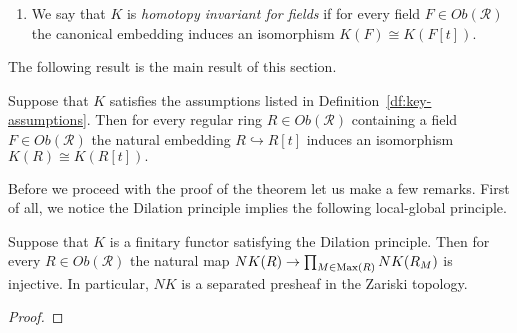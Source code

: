 \documentclass[oneside, 11pt]{amsart} \pdfoutput=1
\begin{document}
\begin{df}
\begin{enumerate}[label=(P\normalfont\arabic*)]
  \item \label{HIF} We say that $K$ is {\it homotopy invariant for fields} if for every field $F \in Ob(\mathcal{R})$ the canonical embedding induces an isomorphism $K(F) \cong K(F[t])$.
 \end{enumerate}
\end{df} 

The following result is the main result of this section.
\begin{theorem}
\label{lpb}
Suppose that $K$ satisfies the assumptions listed in Definition~\ref{df:key-assumptions}.
Then for every regular ring $R\in Ob(\mathcal{R})$ containing a field $F \in Ob(\mathcal{R})$ the natural embedding $R \hookrightarrow R[t]$ induces an isomorphism $K(R)\cong K(R[t]).$
\end{theorem}

Before we proceed with the proof of the theorem let us make a few remarks.
First of all, we notice the Dilation principle implies the following local-global principle.
\begin{lemma} \label{LGP}
 Suppose that $K$ is a finitary functor satisfying the Dilation principle.
 Then for every $R\in Ob(\mathcal{R})$ the natural map $NK(R) \to \prod_{M \in \mathrm{Max}(R)} NK(R_M)$ is injective.
 In particular, $NK$ is a separated presheaf in the Zariski topology.
\end{lemma}
\begin{proof}
 
\end{proof}
\end{document}
